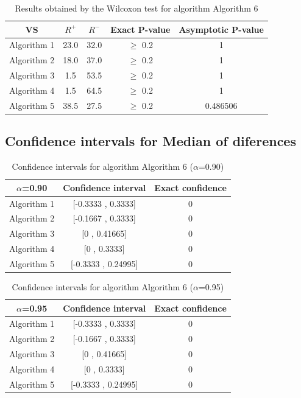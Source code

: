 \documentclass[a4paper,10pt]{article}
\begin{document}
\begin{table}[!htp]
\centering\small
\begin{tabular}{
|c|c|c|c|c|}
\hline
 VS & $R^{+}$ & $R^{-}$ & Exact P-value & Asymptotic P-value \\ \hline 
Algorithm 1 & 23.0 & 32.0 & $\geq$ 0.2 & 1\\ \hline 
Algorithm 2 & 18.0 & 37.0 & $\geq$ 0.2 & 1\\ \hline 
Algorithm 3 & 1.5 & 53.5 & $\geq$ 0.2 & 1\\ \hline 
Algorithm 4 & 1.5 & 64.5 & $\geq$ 0.2 & 1\\ \hline 
Algorithm 5 & 38.5 & 27.5 & $\geq$ 0.2 & 0.486506\\ \hline 

\end{tabular}
\caption{Results obtained by the Wilcoxon test for algorithm Algorithm 6}
\end{table}

\subsection{Confidence intervals for Median of diferences}

\begin{table}[!htp]
\centering\small
\begin{tabular}{
|c|c|c|}
\hline
 $\alpha$=0.90 & Confidence interval & Exact confidence \\ \hline 
Algorithm 1 & [-0.3333 , 0.3333] & 0\\ \hline 
Algorithm 2 & [-0.1667 , 0.3333] & 0\\ \hline 
Algorithm 3 & [0 , 0.41665] & 0\\ \hline 
Algorithm 4 & [0 , 0.3333] & 0\\ \hline 
Algorithm 5 & [-0.3333 , 0.24995] & 0\\ \hline 

\end{tabular}
\caption{Confidence intervals for algorithm Algorithm 6 ($\alpha$=0.90)}
\end{table}
\begin{table}[!htp]
\centering\small
\begin{tabular}{
|c|c|c|}
\hline
 $\alpha$=0.95 & Confidence interval & Exact confidence \\ \hline 
Algorithm 1 & [-0.3333 , 0.3333] & 0\\ \hline 
Algorithm 2 & [-0.1667 , 0.3333] & 0\\ \hline 
Algorithm 3 & [0 , 0.41665] & 0\\ \hline 
Algorithm 4 & [0 , 0.3333] & 0\\ \hline 
Algorithm 5 & [-0.3333 , 0.24995] & 0\\ \hline 

\end{tabular}
\caption{Confidence intervals for algorithm Algorithm 6 ($\alpha$=0.95)}
\end{table}

 \clearpage 
\end{document}
